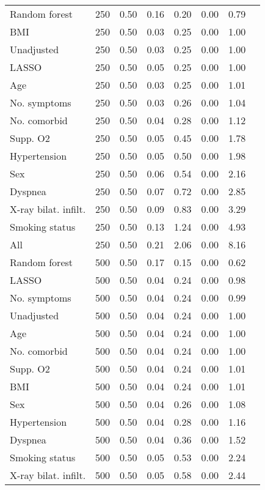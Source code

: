 \documentclass{article}
\begin{document}
{\begin{longtable}{lccccccc}
Random forest & 250 & 0.50 & 0.16 & 0.20 &  0.00 &  0.79 \\ 
BMI & 250 & 0.50 & 0.03 & 0.25 &  0.00 &  1.00 \\ 
Unadjusted & 250 & 0.50 & 0.03 & 0.25 &  0.00 &  1.00 \\ 
LASSO & 250 & 0.50 & 0.05 & 0.25 &  0.00 &  1.00 \\ 
Age & 250 & 0.50 & 0.03 & 0.25 &  0.00 &  1.01 \\ 
No. symptoms & 250 & 0.50 & 0.03 & 0.26 &  0.00 &  1.04 \\ 
No. comorbid & 250 & 0.50 & 0.04 & 0.28 &  0.00 &  1.12 \\ 
Supp. O2 & 250 & 0.50 & 0.05 & 0.45 &  0.00 &  1.78 \\ 
Hypertension & 250 & 0.50 & 0.05 & 0.50 &  0.00 &  1.98 \\ 
Sex & 250 & 0.50 & 0.06 & 0.54 &  0.00 &  2.16 \\ 
Dyspnea & 250 & 0.50 & 0.07 & 0.72 &  0.00 &  2.85 \\ 
X-ray bilat. infilt. & 250 & 0.50 & 0.09 & 0.83 &  0.00 &  3.29 \\ 
Smoking status & 250 & 0.50 & 0.13 & 1.24 &  0.00 &  4.93 \\ 
All & 250 & 0.50 & 0.21 & 2.06 &  0.00 &  8.16 \\ \midrule() 
Random forest & 500 & 0.50 & 0.17 & 0.15 &  0.00 &  0.62 \\ 
LASSO & 500 & 0.50 & 0.04 & 0.24 &  0.00 &  0.98 \\ 
No. symptoms & 500 & 0.50 & 0.04 & 0.24 &  0.00 &  0.99 \\ 
Unadjusted & 500 & 0.50 & 0.04 & 0.24 &  0.00 &  1.00 \\ 
Age & 500 & 0.50 & 0.04 & 0.24 &  0.00 &  1.00 \\ 
No. comorbid & 500 & 0.50 & 0.04 & 0.24 &  0.00 &  1.00 \\ 
Supp. O2 & 500 & 0.50 & 0.04 & 0.24 &  0.00 &  1.01 \\ 
BMI & 500 & 0.50 & 0.04 & 0.24 &  0.00 &  1.01 \\ 
Sex & 500 & 0.50 & 0.04 & 0.26 &  0.00 &  1.08 \\ 
Hypertension & 500 & 0.50 & 0.04 & 0.28 &  0.00 &  1.16 \\ 
Dyspnea & 500 & 0.50 & 0.04 & 0.36 &  0.00 &  1.52 \\ 
Smoking status & 500 & 0.50 & 0.05 & 0.53 &  0.00 &  2.24 \\ 
X-ray bilat. infilt. & 500 & 0.50 & 0.05 & 0.58 &  0.00 &  2.44 \\ 

\end{longtable}}
\end{document}
